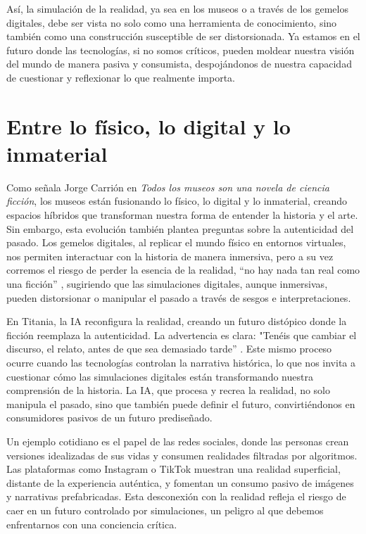\documentclass[
  spanish,
  11pt,
  a4paper,
]{scrbook}
\begin{document}
Así, la simulación de la realidad, ya sea en los museos o a través de
los gemelos digitales, debe ser vista no solo como una herramienta de
conocimiento, sino también como una construcción susceptible de ser
distorsionada. Ya estamos en el futuro donde las tecnologías, si no
somos críticos, pueden moldear nuestra visión del mundo de manera pasiva
y consumista, despojándonos de nuestra capacidad de cuestionar y
reflexionar lo que realmente importa.

\section*{Entre lo físico, lo digital y lo
inmaterial}\label{entre-lo-fuxedsico-lo-digital-y-lo-inmaterial}


Como señala Jorge Carrión en \emph{Todos los museos son una novela de
ciencia ficción}, los museos están fusionando lo físico, lo digital y lo
inmaterial, creando espacios híbridos que transforman nuestra forma de
entender la historia y el arte. Sin embargo, esta evolución también
plantea preguntas sobre la autenticidad del pasado. Los gemelos
digitales, al replicar el mundo físico en entornos virtuales, nos
permiten interactuar con la historia de manera inmersiva, pero a su vez
corremos el riesgo de perder la esencia de la realidad, ``no hay nada
tan real como una ficción'' \autocite[60]{Carrion2022}, sugiriendo que
las simulaciones digitales, aunque inmersivas, pueden distorsionar o
manipular el pasado a través de sesgos e interpretaciones.

En Titania, la IA reconfigura la realidad, creando un futuro distópico
donde la ficción reemplaza la autenticidad. La advertencia es clara:
"Tenéis que cambiar el discurso, el relato, antes de que sea demasiado
tarde'' \autocite[92]{Carrion2022}. Este mismo proceso ocurre cuando las
tecnologías controlan la narrativa histórica, lo que nos invita a
cuestionar cómo las simulaciones digitales están transformando nuestra
comprensión de la historia. La IA, que procesa y recrea la realidad, no
solo manipula el pasado, sino que también puede definir el futuro,
convirtiéndonos en consumidores pasivos de un futuro prediseñado.

Un ejemplo cotidiano es el papel de las redes sociales, donde las
personas crean versiones idealizadas de sus vidas y consumen realidades
filtradas por algoritmos. Las plataformas como Instagram o TikTok
muestran una realidad superficial, distante de la experiencia auténtica,
y fomentan un consumo pasivo de imágenes y narrativas prefabricadas.
Esta desconexión con la realidad refleja el riesgo de caer en un futuro
controlado por simulaciones, un peligro al que debemos enfrentarnos con
una conciencia crítica.
\end{document}
